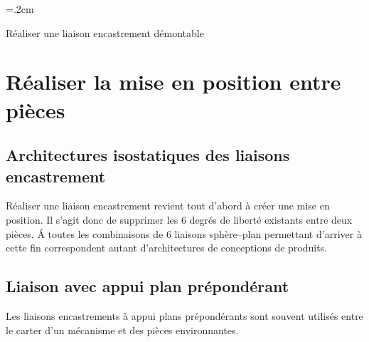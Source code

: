 \documentclass[11pt,oneside]{article}
\begin{document}
\FASTInterligne=.2cm %
\begin{FAST}{Réaliser une liaison encastrement démontable}
\end{FAST}
\FASTReset %


\section{Réaliser la mise en position entre pièces}
\subsection{Architectures isostatiques des liaisons encastrement}
Réaliser une liaison encastrement revient tout d'abord à créer une mise en position. Il s'agit donc de supprimer les 6 degrés de liberté existants entre deux pièces. \'A toutes les combinaisons de 6 liaisons sphère--plan permettant d'arriver à cette fin correspondent autant d'architectures de conceptions de produits.





\subsection{Liaison avec appui plan prépondérant}
Les liaisons encastrements à appui plans prépondérants sont souvent utilisés entre le carter d'un mécanisme et des pièces environnantes.
\end{document}
